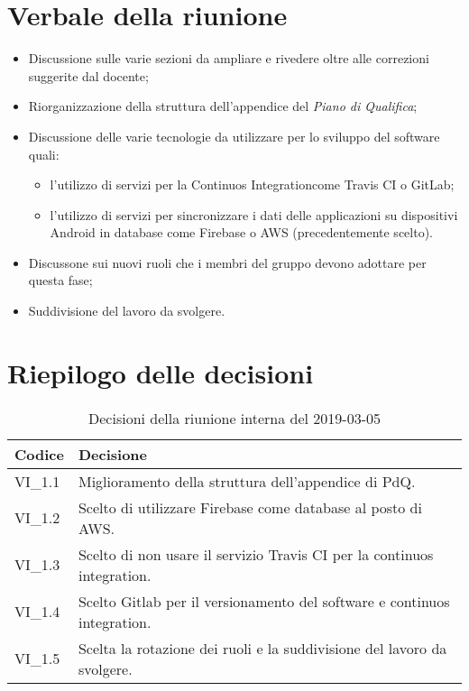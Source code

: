 \section{Verbale della riunione}
\begin{itemize}
	\item Discussione sulle varie sezioni da ampliare e rivedere oltre alle correzioni suggerite dal docente;
	\item Riorganizzazione della struttura dell'appendice del \textit{Piano di Qualifica};
	\item Discussione delle varie tecnologie da utilizzare per lo sviluppo del software quali:
		\begin{itemize}
			\item l'utilizzo di servizi per la Continuos Integration\glosp come Travis CI o GitLab\glo;
			\item l'utilizzo di servizi per sincronizzare i dati delle applicazioni su dispositivi Android in database come Firebase o AWS (precedentemente scelto).
		\end{itemize}
	\item Discussone sui nuovi ruoli che i membri del gruppo devono adottare per questa fase;
	\item Suddivisione del lavoro da svolgere.

\end{itemize} 
\pagebreak
\section{Riepilogo delle decisioni}

	
	\begin{longtable}{ >{\centering}p{} >{}p{}}
		\caption{Decisioni della riunione interna del 2019-03-05}\\	
		\rowcolorhead
		\textbf{\color{white}Codice} 
		& \centering\textbf{\color{white}Decisione} 
		\tabularnewline 
		\endfirsthead
		VI\_1.1 & Miglioramento della struttura dell'appendice di PdQ.
		
		\tabularnewline 
		VI\_1.2 & Scelto di utilizzare Firebase come database al posto di AWS.
		
		\tabularnewline 
		VI\_1.3 & Scelto di non usare il servizio Travis CI per la continuos integration.
	
		\tabularnewline 
		VI\_1.4 & Scelto Gitlab per il versionamento del software e continuos integration.
		
		\tabularnewline 
		VI\_1.5 & Scelta la rotazione dei ruoli e la suddivisione del lavoro da svolgere.
	
	\end{longtable}
	





